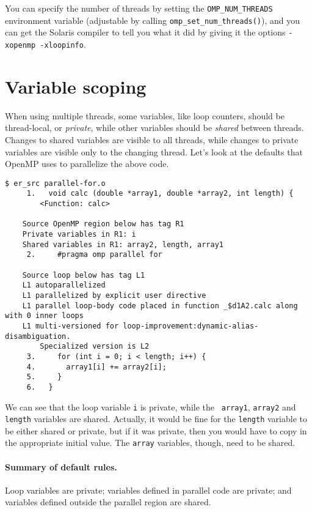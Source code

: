You can specify the number of threads by setting the
\verb+OMP_NUM_THREADS+ environment variable (adjustable by calling 
\verb+omp_set_num_threads()+), and you can get the
Solaris compiler to tell you what it did by giving it the
options \verb+-xopenmp -xloopinfo+.

\section*{Variable scoping}
When using multiple threads, some variables, like loop counters,
should be thread-local, or \emph{private}, while other variables
should be \emph{shared} between threads. Changes to shared variables
are visible to all threads, while changes to private variables are
visible only to the changing thread. Let's look at the defaults that
OpenMP uses to parallelize the above code.

{ 
\begin{verbatim}
$ er_src parallel-for.o
     1.   void calc (double *array1, double *array2, int length) {
        <Function: calc>
    
    Source OpenMP region below has tag R1
    Private variables in R1: i
    Shared variables in R1: array2, length, array1
     2.     #pragma omp parallel for
    
    Source loop below has tag L1
    L1 autoparallelized
    L1 parallelized by explicit user directive
    L1 parallel loop-body code placed in function _$d1A2.calc along with 0 inner loops
    L1 multi-versioned for loop-improvement:dynamic-alias-disambiguation. 
        Specialized version is L2
     3.     for (int i = 0; i < length; i++) {
     4.       array1[i] += array2[i];
     5.     }
     6.   }
\end{verbatim}
}

We can see that the loop variable {\tt i} is private, while the {\tt
  array1}, {\tt array2} and {\tt length} variables are shared.
Actually, it would be fine for the {\tt length} variable to be either
shared or private, but if it was private, then you would have to copy
in the appropriate initial value. The {\tt array} variables, though, 
need to be shared.

\paragraph{Summary of default rules.} Loop variables are private; 
variables defined in parallel code are private; and variables defined
outside the parallel region are shared.

